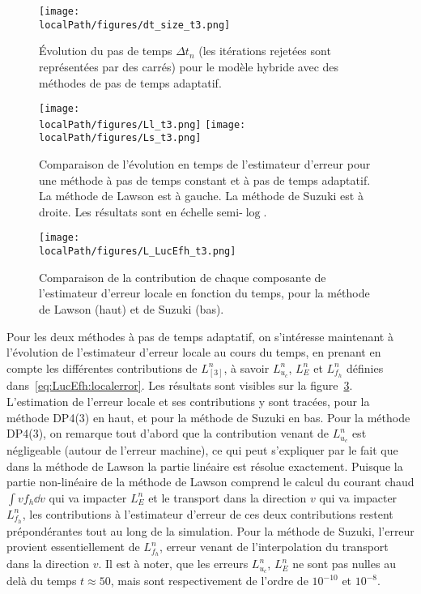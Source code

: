 \begin{figure}[h]
  \centering
  \texttt{[image: \\localPath/figures/dt\_size\_t3.png]}
  \caption{Évolution du pas de temps $\Delta t_n$ (les itérations rejetées sont représentées par des carrés) pour le modèle hybride avec des méthodes de pas de temps adaptatif.} 
  \label{fig:compare:dt_and_error}
\end{figure}

\begin{figure}[h]
  \centering
  \texttt{[image: \\localPath/figures/Ll\_t3.png]}
  \texttt{[image: \\localPath/figures/Ls\_t3.png]}
  \caption{Comparaison de l'évolution en temps de l'estimateur d'erreur pour une méthode à pas de temps constant et à pas de temps adaptatif. La méthode de Lawson est à gauche. La méthode de Suzuki est à droite. Les résultats sont en échelle semi-$\log$.}
  \label{fig:compare:error:dtc}
\end{figure}
\begin{figure}[h]
  \centering
  \texttt{[image: \\localPath/figures/L\_LucEfh\_t3.png]}
  \caption{Comparaison de la contribution de chaque composante de l'estimateur d'erreur locale en fonction du temps, pour la méthode de Lawson (haut) et de Suzuki (bas).}
  \label{fig:compare:error:LucEfh}
\end{figure}

Pour les deux méthodes à pas de temps adaptatif, on s'intéresse maintenant à l'évolution de l'estimateur d'erreur locale au cours du temps, en prenant en compte les différentes contributions de $L^n_{[3]}$, à savoir $L^n_{u_c}$, $L^n_{E}$ et $L^n_{f_h}$ définies dans~\eqref{eq:LucEfh:localerror}. Les résultats sont visibles sur la figure~\ref{fig:compare:error:LucEfh}. L'estimation de l'erreur locale et ses contributions y sont tracées, pour la méthode DP4(3) en haut, et pour la méthode de Suzuki en bas. Pour la méthode DP4(3), on remarque tout d'abord que la contribution venant de $L^n_{u_c}$ est négligeable (autour de l'erreur machine), ce qui peut s'expliquer par le fait que dans la méthode de Lawson la partie linéaire est résolue exactement. Puisque la partie non-linéaire de la méthode de Lawson comprend le calcul du courant chaud $\int vf_h\dd{v}$ qui va impacter $L^n_E$ et le transport dans la direction $v$ qui va impacter $L^n_{f_h}$, les contributions à l'estimateur d'erreur de ces deux contributions restent prépondérantes tout au long de la simulation. Pour la méthode de Suzuki, l'erreur provient essentiellement de $L^n_{f_h}$, erreur venant de l'interpolation du transport dans la direction $v$. Il est à noter, que les erreurs $L^n_{u_c}$, $L^n_{E}$ ne sont pas nulles au delà du temps $t\approx 50$, mais sont respectivement de l'ordre de $10^{-10}$ et $10^{-8}$.

